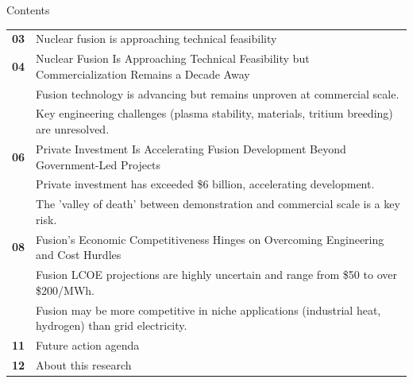 \documentclass[10pt,a4paper]{article}
\begin{document}
\clearpage
{\sffamily\fontsize{26}{31}\selectfont\color{BONavy} Contents}\par\vspace{10pt}
\begin{tabularx}{\linewidth}{p{14mm}Y}
\textcolor{BOGreen}{\bfseries 03} & Nuclear fusion is approaching technical feasibility \\[7pt]
\textcolor{BOGreen}{\bfseries 04} & Nuclear Fusion Is Approaching Technical Feasibility but Commercialization Remains a Decade Away \\[5pt]
 & {\scriptsize\color{BOMuted} Fusion technology is advancing but remains unproven at commercial scale.} \\[1pt]
 & {\scriptsize\color{BOMuted} Key engineering challenges (plasma stability, materials, tritium breeding) are unresolved.} \\[1pt]
\textcolor{BOGreen}{\bfseries 06} & Private Investment Is Accelerating Fusion Development Beyond Government-Led Projects \\[5pt]
 & {\scriptsize\color{BOMuted} Private investment has exceeded \$6 billion, accelerating development.} \\[1pt]
 & {\scriptsize\color{BOMuted} The 'valley of death' between demonstration and commercial scale is a key risk.} \\[1pt]
\textcolor{BOGreen}{\bfseries 08} & Fusion's Economic Competitiveness Hinges on Overcoming Engineering and Cost Hurdles \\[5pt]
 & {\scriptsize\color{BOMuted} Fusion LCOE projections are highly uncertain and range from \$50 to over \$200/MWh.} \\[1pt]
 & {\scriptsize\color{BOMuted} Fusion may be more competitive in niche applications (industrial heat, hydrogen) than grid electricity.} \\[1pt]
\textcolor{BOGreen}{\bfseries 11} & Future action agenda \\[5pt]
\textcolor{BOGreen}{\bfseries 12} & About this research \\[5pt]
\end{tabularx}
\clearpage
\end{document}
